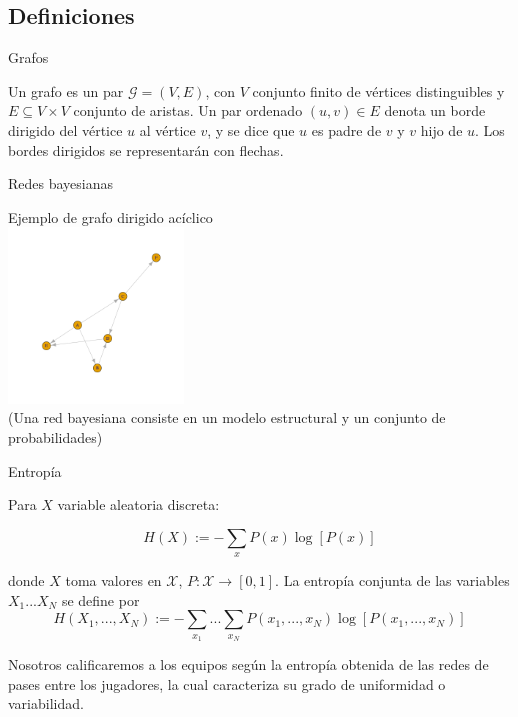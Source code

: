 \documentclass{beamer}
\begin{document}
\subsection{Definiciones}
\begin{frame}{Grafos}
	\begin{definition}
		Un grafo es un par $\mathcal{G} = (V, E)$, con $V$ conjunto finito de vértices distinguibles y 
		$E \subseteq V \times V$ conjunto de aristas. Un par ordenado $(u, v) \in E$ denota un borde dirigido
		del vértice $u$ al vértice $v$, y se dice que $u$ es padre de $v$ y $v$ hijo de $u$. Los bordes dirigidos 
		se representarán con flechas. 
	\end{definition}
\end{frame}

\begin{frame}{Redes bayesianas}
	\begin{center}
		Ejemplo de grafo dirigido acíclico \\[12pt]
		\includegraphics[width=0.35\textwidth,keepaspectratio]{dag.png}
		\\
		\footnotesize(Una red bayesiana consiste en un modelo estructural y un conjunto de probabilidades)
    \end{center}
\end{frame}

\begin{frame}{Entropía}
	\begin{definition}[Entropía] \label{def:entropy}
        Para $X$ variable aleatoria discreta:  
        
        $$H(X):= - \sum_{x} P(x)\log[P(x)]$$
        
        donde $X$ toma valores en $\mathcal{X}$, $P:\mathcal{X} \rightarrow [0,1]$.
        La entropía conjunta de las variables $X_1...X_N$ se define por 
        $$H(X_1,...,X_N):=-\sum_{x_1}...\sum_{x_N}P(x_1,...,x_N)\log[P(x_1,...,x_N)]$$
    \end{definition}
	\begin{example}
	Nosotros calificaremos a los equipos según la entropía obtenida de las redes de pases entre los jugadores, 
 	la cual caracteriza su grado de uniformidad o variabilidad.
	\end{example}
\end{frame}
\end{document}
